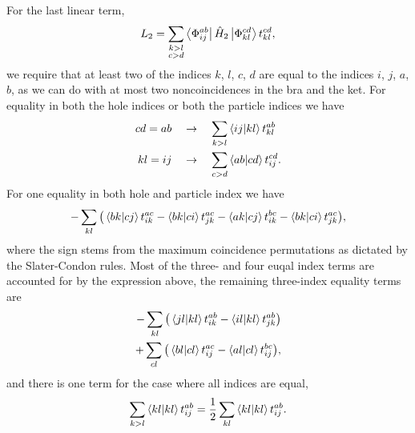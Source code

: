 For the last linear term,
\begin{equation}
    L_2 = \sum_{\substack{k>l \\ c>d}}\bra{\Phi^{ab}_{ij}} \hat{H}_2 \ket{\Phi^{cd}_{kl}} t^{cd}_{kl},
\end{equation}
we require that at least two of the indices $k$, $l$, $c$, $d$ are equal to the indices $i$, $j$, $a$, $b$,
as we can do with at most two noncoincidences in the bra and the ket. For equality in
both the hole indices or both the particle indices we have
\begin{align}
    cd = ab \quad &\to \quad \sum_{k>l}\bra{ij}\ket{kl} t^{ab}_{kl} \\ 
    kl = ij \quad &\to \quad \sum_{c>d}\bra{ab}\ket{cd} t^{cd}_{ij}.
\end{align}
For one equality in both hole and particle index we have
\begin{equation}
    -\sum_{kl}\big(\bra{bk}\ket{cj} t^{ac}_{ik} - \bra{bk}\ket{ci} t^{ac}_{jk}  
                -\bra{ak}\ket{cj} t^{bc}_{ik} - \bra{bk}\ket{ci}  t^{ac}_{jk} \big),
\end{equation}
where the sign stems from the maximum coincidence permutations as dictated by the
Slater-Condon rules. Most of the three- and four euqal index terms are accounted
for by the expression above, the remaining three-index equality terms are
\begin{align}
    -\sum_{kl}\big( \bra{jl}\ket{kl} t^{ab}_{ik} - \bra{il}\ket{kl} t^{ab}_{jk} \big) \\
    +\sum_{cl}\big( \bra{bl}\ket{cl} t^{ac}_{ij} - \bra{al}\ket{cl} t^{bc}_{ij} \big),
\end{align}
and there is one term for the case where all indices are equal,
\begin{equation}
    \sum_{k>l} \bra{kl} \ket{kl} t^{ab}_{ij} = \frac{1}{2} \sum_{kl} \bra{kl} \ket{kl} t^{ab}_{ij}.
\end{equation}

